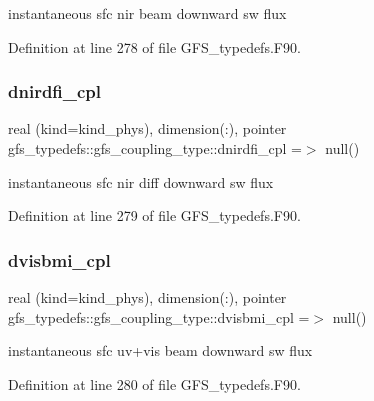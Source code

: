 instantaneous sfc nir beam downward sw flux 



Definition at line 278 of file G\+F\+S\+\_\+typedefs.\+F90.

\mbox{\label{structgfs__typedefs_1_1gfs__coupling__type_a2c3d4bd312dc85b07481af2cdf621d82}} 
\subsubsection{dnirdfi\+\_\+cpl}
{\footnotesize\ttfamily real (kind=kind\+\_\+phys), dimension(\+:), pointer gfs\+\_\+typedefs\+::gfs\+\_\+coupling\+\_\+type\+::dnirdfi\+\_\+cpl =$>$ null()}



instantaneous sfc nir diff downward sw flux 



Definition at line 279 of file G\+F\+S\+\_\+typedefs.\+F90.

\mbox{\label{structgfs__typedefs_1_1gfs__coupling__type_a71cc551cecf6bea47252906e2629bd80}} 
\subsubsection{dvisbmi\+\_\+cpl}
{\footnotesize\ttfamily real (kind=kind\+\_\+phys), dimension(\+:), pointer gfs\+\_\+typedefs\+::gfs\+\_\+coupling\+\_\+type\+::dvisbmi\+\_\+cpl =$>$ null()}



instantaneous sfc uv+vis beam downward sw flux 



Definition at line 280 of file G\+F\+S\+\_\+typedefs.\+F90.

\mbox{\label{structgfs__typedefs_1_1gfs__coupling__type_a8c923110e4845ae5ccc9ae4ef18f7a1e}} 

